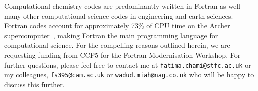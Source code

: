 \documentclass[12pt]{article}
\begin{document}
Computational chemistry codes are predominantly written in Fortran as well many other computational science codes in
engineering and earth sciences. Fortran codes account for approximately 73\% of CPU time on the Archer
supercomputer~\cite{archer:usage}, making Fortran the main programming language for computational science. For the compelling
reasons outlined herein, we are requesting funding from CCP5 for the Fortran Modernisation Workshop. For further questions,
please feel free to contact me at \texttt{fatima.chami@stfc.ac.uk} or my colleagues, \texttt{fs395@cam.ac.uk} or 
\texttt{wadud.miah@nag.co.uk} who will be happy to discuss this further. 
%


%
\end{document}

